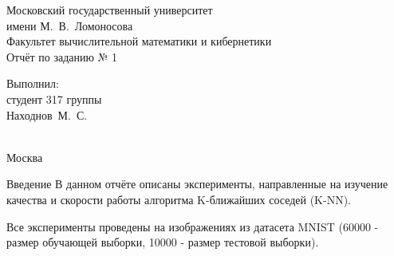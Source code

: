 \documentclass[a4paper,12pt,titlepage,finall]{article}
\begin{document}
	\begin{titlepage}
		\begin{center}
			{\small \sc Московский государственный университет \\имени М.~В.~Ломоносова\\
				Факультет вычислительной математики и кибернетики\\}
			\vfill
			{\Large \sc Отчёт по заданию № 1}\\
		\end{center}
		\begin{flushright}
			\vfill {Выполнил:\\
				студент 317 группы\\
				Находнов~М.~С.\\
				~\\}
		\end{flushright}
		\begin{center}
			\vfill
			{\small Москва\\\the\year}
		\end{center}
	\end{titlepage}
		
\tableofcontents
\newpage
	
\begin{section}{Введение}
	В данном отчёте описаны  эксперименты, направленные на изучение качества и скорости работы алгоритма K-ближайших соседей (K-NN).\par
	Все эксперименты проведены на изображениях из датасета MNIST (60000 - размер обучающей выборки, 10000 - размер тестовой выборки).
\end{section}
\end{document}
